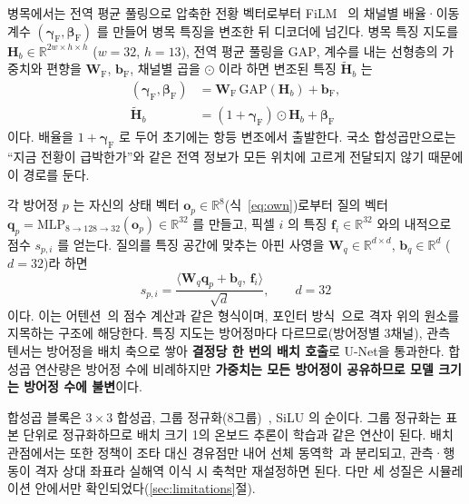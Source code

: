 병목에서는 전역 평균 풀링으로 압축한 전황 벡터로부터 FiLM~\citep{perez2018film} 의
채널별 배율·이동 계수 $(\boldsymbol{\gamma}_{\mathrm{F}}, \boldsymbol{\beta}_{\mathrm{F}})$ 를
만들어 병목 특징을 변조한 뒤 디코더에 넘긴다. 병목 특징 지도를 $\mathbf{H}_b \in \mathbb{R}^{2w \times h \times h}$
($w = 32$, $h = 13$), 전역 평균 풀링을 $\mathrm{GAP}$, 계수를 내는 선형층의 가중치와 편향을
$\mathbf{W}_{\mathrm{F}}$, $\mathbf{b}_{\mathrm{F}}$, 채널별 곱을 $\odot$ 이라 하면 변조된 특징
$\tilde{\mathbf{H}}_b$ 는
\begin{equation}
\begin{aligned}
(\boldsymbol{\gamma}_{\mathrm{F}}, \boldsymbol{\beta}_{\mathrm{F}})
  &= \mathbf{W}_{\mathrm{F}}\, \mathrm{GAP}(\mathbf{H}_b) + \mathbf{b}_{\mathrm{F}},\\
\tilde{\mathbf{H}}_b &= (1 + \boldsymbol{\gamma}_{\mathrm{F}}) \odot \mathbf{H}_b + \boldsymbol{\beta}_{\mathrm{F}}
\end{aligned}
\label{eq:film}
\end{equation}
이다. 배율을 $1 + \boldsymbol{\gamma}_{\mathrm{F}}$ 로 두어 초기에는
항등 변조에서 출발한다. 국소 합성곱만으로는 ``지금 전황이 급박한가''와 같은 전역 정보가
모든 위치에 고르게 전달되지 않기 때문에 이 경로를 둔다.

각 방어정 $p$ 는 자신의 상태 벡터 $\mathbf{o}_p \in \mathbb{R}^8$(식~\eqref{eq:own})로부터
질의 벡터 $\mathbf{q}_p = \mathrm{MLP}_{8 \to 128 \to 32}(\mathbf{o}_p) \in \mathbb{R}^{32}$ 를
만들고, 픽셀 $i$ 의 특징 $\mathbf{f}_i \in \mathbb{R}^{32}$ 와의 내적으로 점수 $s_{p,i}$ 를
얻는다. 질의를 특징 공간에 맞추는 아핀 사영을 $\mathbf{W}_q \in \mathbb{R}^{d \times d}$,
$\mathbf{b}_q \in \mathbb{R}^{d}$ ($d = 32$)라 하면
\begin{equation}
s_{p,i} = \frac{\langle \mathbf{W}_q \mathbf{q}_p + \mathbf{b}_q,\, \mathbf{f}_i \rangle}{\sqrt{d}}, \qquad d = 32
\label{eq:score}
\end{equation}
이다. 이는 어텐션~\citep{vaswani2017attention}의 점수 계산과 같은 형식이며, 포인터
방식~\citep{vinyals2015pointer}으로 격자 위의 원소를 지목하는 구조에 해당한다. 특징 지도는
방어정마다 다르므로(방어정별 3채널), 관측 텐서는 방어정을 배치 축으로 쌓아 \textbf{결정당 한
번의 배치 호출}로 U-Net을 통과한다. 합성곱 연산량은 방어정 수에 비례하지만 \textbf{가중치는
모든 방어정이 공유하므로 모델 크기는 방어정 수에 불변}이다.

합성곱 블록은 $3\times3$ 합성곱, 그룹 정규화(8그룹)~\citep{wu2018groupnorm}, SiLU 의 순이다.
그룹 정규화는 표본 단위로 정규화하므로 배치 크기 1의 온보드 추론이 학습과 같은 연산이 된다.
배치 관점에서는 또한 정책이 조타 대신 경유점만 내어
선체 동역학~\citep{fossen2011marine}과 분리되고, 관측·행동이 격자 상대 좌표라 실해역
이식 시 축척만 재설정하면 된다. 다만 세 성질은 시뮬레이션 안에서만 확인되었다(\ref{sec:limitations}절).

